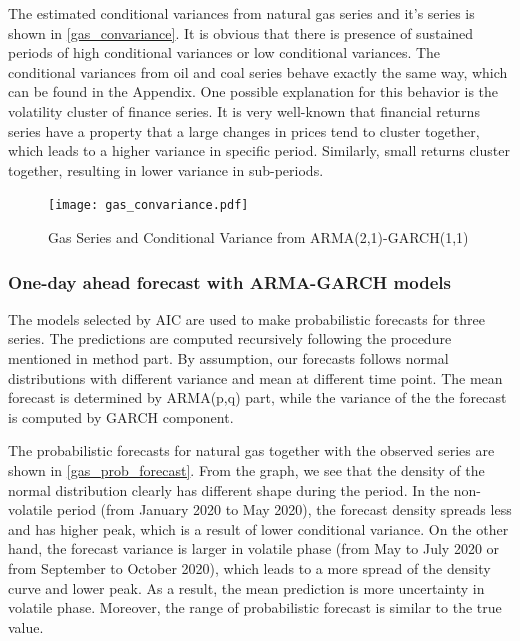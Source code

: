 \documentclass[12pt,a4paper]{article}
\newcommand\colorAutoref[1]{{\hypersetup{linkcolor=black}\autoref{#1}}}
\numberwithin{equation}{section}
\begin{document}
The estimated conditional variances from natural gas series and it's series is shown in \colorAutoref{gas_convariance}. It is obvious that there is presence of sustained periods of high conditional variances or low conditional variances. The conditional variances from oil and coal series behave exactly the same way, which can be found in the Appendix. One possible explanation for this behavior is the volatility cluster of finance series. It is very well-known that financial returns series have a property that a large changes in prices tend to cluster together, which leads to a higher variance in specific period. Similarly, small returns cluster together, resulting in lower variance in sub-periods. 

\vspace*{-5mm}
\begin{figure}[H] 
\texttt{[image: gas\_convariance.pdf]}
\vspace*{-25mm}
\caption{Gas Series and Conditional Variance from ARMA(2,1)-GARCH(1,1)}
\label{gas_convariance}
\end{figure} 

\subsubsection{One-day ahead forecast with ARMA-GARCH models}
The models selected by AIC are used to make probabilistic forecasts for three series. The predictions are computed recursively following the procedure mentioned in method part. By assumption, our forecasts follows normal distributions with different variance and mean at different time point. The mean forecast is determined by ARMA(p,q) part, while the variance of the the forecast is computed by GARCH component. 

The probabilistic forecasts for natural gas together with the observed series are shown in \colorAutoref{gas_prob_forecast}. From the graph, we see that the density of the normal distribution clearly has different shape during the period. In the non-volatile period (from January 2020 to May 2020), the forecast density spreads less and has higher peak, which is a result of lower conditional variance. On the other hand, the forecast variance is larger in volatile phase (from May to July 2020 or from September to October 2020), which leads to a more spread of the density curve and lower peak. As a result, the mean prediction is more uncertainty in volatile phase. Moreover, the range of probabilistic forecast is similar to the true value.
\end{document}
